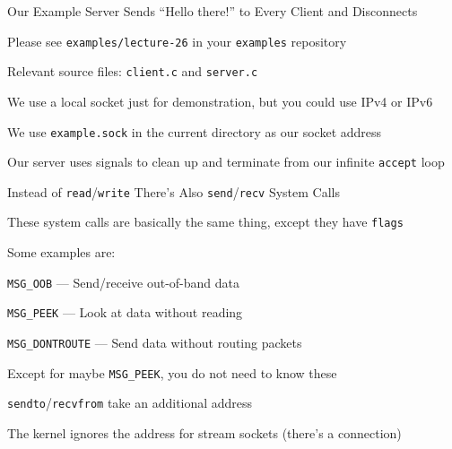   \begin{frame}{Our Example Server Sends ``Hello there!'' to Every Client and
                Disconnects}

    Please see \texttt{examples/lecture-26} in your \texttt{examples} repository

    \hspace{2em} Relevant source files: \texttt{client.c} and \texttt{server.c}

    \vspace{2em}

    We use a local socket just for demonstration, but you could use IPv4 or IPv6

    \hspace{2em} We use \texttt{example.sock} in the current directory as our
                 socket address

    \vspace{2em}

    Our server uses signals to clean up and terminate from our infinite
    \texttt{accept} loop
  \end{frame}

  \begin{frame}{Instead of \texttt{read}/\texttt{write} There's Also
                \texttt{send}/\texttt{recv} System Calls}

    These system calls are basically the same thing, except they have
    \texttt{flags}

    \vspace{2em}

    Some examples are:

    \hspace{2em} \texttt{MSG\_OOB} --- Send/receive out-of-band data

    \hspace{2em} \texttt{MSG\_PEEK} --- Look at data without reading

    \hspace{2em} \texttt{MSG\_DONTROUTE} --- Send data without routing packets

    \vspace{2em}

    Except for maybe \texttt{MSG\_PEEK}, you do not need to know these

    \vspace{2em}

    \texttt{sendto}/\texttt{recvfrom} take an additional address

    \hspace{2em} The kernel ignores the address for stream sockets (there's a
                 connection)
  \end{frame}

